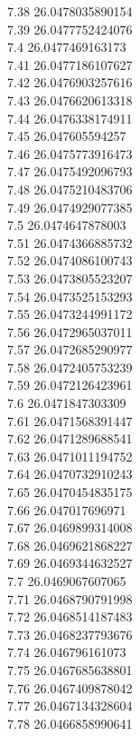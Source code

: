 {7.38	26.0478035890154\\
7.39	26.0477752424076\\
7.4	26.0477469163173\\
7.41	26.0477186107627\\
7.42	26.0476903257616\\
7.43	26.0476620613318\\
7.44	26.0476338174911\\
7.45	26.047605594257\\
7.46	26.0475773916473\\
7.47	26.0475492096793\\
7.48	26.0475210483706\\
7.49	26.0474929077385\\
7.5	26.0474647878003\\
7.51	26.0474366885732\\
7.52	26.0474086100743\\
7.53	26.0473805523207\\
7.54	26.0473525153293\\
7.55	26.0473244991172\\
7.56	26.0472965037011\\
7.57	26.0472685290977\\
7.58	26.0472405753239\\
7.59	26.0472126423961\\
7.6	26.0471847303309\\
7.61	26.0471568391447\\
7.62	26.0471289688541\\
7.63	26.0471011194752\\
7.64	26.0470732910243\\
7.65	26.0470454835175\\
7.66	26.047017696971\\
7.67	26.0469899314008\\
7.68	26.0469621868227\\
7.69	26.0469344632527\\
7.7	26.0469067607065\\
7.71	26.0468790791998\\
7.72	26.0468514187483\\
7.73	26.0468237793676\\
7.74	26.046796161073\\
7.75	26.0467685638801\\
7.76	26.0467409878042\\
7.77	26.0467134328604\\
7.78	26.0466858990641\\
}
